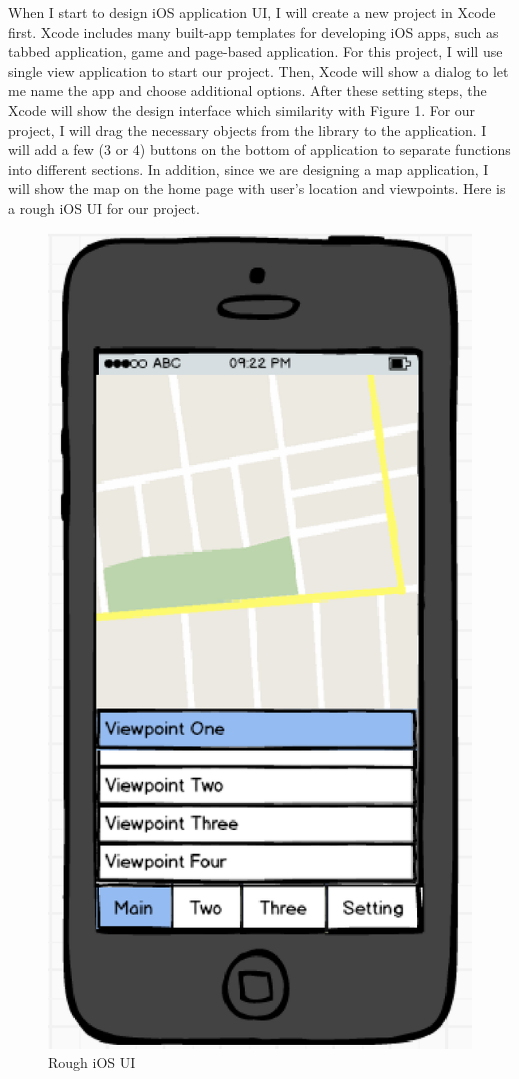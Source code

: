 \documentclass[letterpaper, 10pt,titlepage]{article}
\begin{document}
When I start to design iOS application UI, I will create a new project in Xcode first. Xcode includes many built-app templates for developing iOS apps, such as tabbed application, game and page-based application. For this project, I will use single view application to start our project. Then, Xcode will show a dialog to let me name the app and choose additional options. After these setting steps, the Xcode will show the design interface which similarity with Figure 1. For our project, I will drag the necessary objects from the library to the application. I will add a few (3 or 4) buttons on the bottom of application to separate functions into different sections. In addition, since we are designing a map application, I will show the map on the home page with user’s location and viewpoints. Here is a rough iOS UI for our project.

\begin{figure}[ht]
    \centering
    \includegraphics[scale=0.5]{j2}
    \caption{Rough iOS UI}
    \label{jiawei2}
\end{figure}
\end{document}
